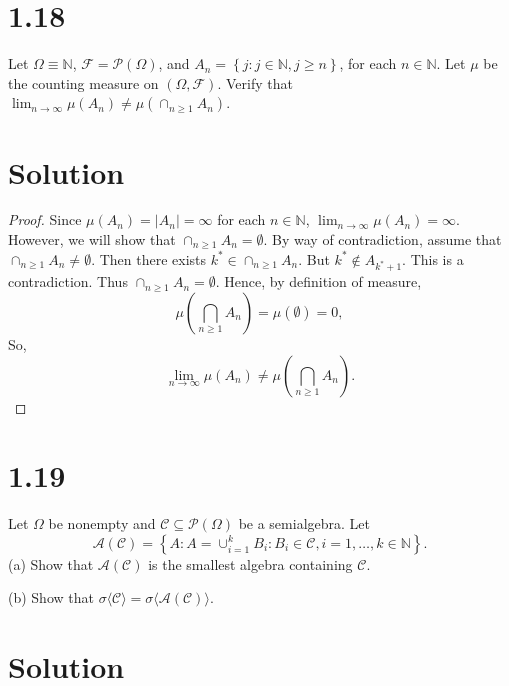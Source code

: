 \documentclass[12pt]{article}
\begin{document}
\newpage
\section*{1.18}

Let $\Omega \equiv \mathbb{N}$, $\mathcal{F} = \mathcal{P}(\Omega)$, and $A_{n} = \left\{ j : j \in \mathbb{N}, j \geq n \right\}$, for each $n \in
\mathbb{N}$. Let $\mu$ be the counting measure on $(\Omega, \mathcal{F})$. Verify that $\lim_{n\rightarrow\infty}\mu(A_{n}) \neq \mu\left( \cap_{n\geq
1}A_{n} \right)$.

\section*{Solution}

\begin{proof}
Since $\mu(A_{n}) = |A_{n}| = \infty$ for each $n \in \mathbb{N}$, $\lim_{n\rightarrow\infty}\mu(A_{n}) = \infty$. However, we will show that
$\cap_{n\geq 1}A_{n} = \emptyset$. By way of contradiction, assume that $\cap_{n\geq 1}A_{n} \neq \emptyset$. Then there exists $k^{*} \in
\cap_{n\geq 1}A_{n}$. But $k^{*} \notin A_{k^{*}+1}$. This is a contradiction. Thus $\cap_{n\geq 1}A_{n} = \emptyset$. Hence, by definition of measure,
\[ \mu\left( \bigcap_{n\geq 1}A_{n} \right) = \mu(\emptyset) = 0, \]
So,
\[ \lim_{n\rightarrow \infty}\mu(A_{n}) \neq \mu\left( \bigcap_{n\geq 1}A_{n} \right). \]
\end{proof}



\newpage
\section*{1.19}

Let $\Omega$ be nonempty and $\mathcal{C} \subseteq \mathcal{P}(\Omega)$ be a semialgebra. Let 
\[ \mathcal{A}(\mathcal{C}) = \left\{ A : A = \cup_{i=1}^{k}B_{i} : B_{i} \in \mathcal{C}, i = 1, \dots, k \in \mathbb{N} \right\}. \]
(a) Show that $\mathcal{A}(\mathcal{C})$ is the smallest algebra containing $\mathcal{C}$.

(b) Show that $\sigma\langle\mathcal{C}\rangle = \sigma\langle\mathcal{A}(\mathcal{C})\rangle$.

\section*{Solution}
\end{document}

